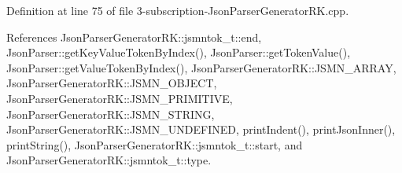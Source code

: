 Definition at line 75 of file 3-\/subscription-\/\+Json\+Parser\+Generator\+R\+K.\+cpp.



References Json\+Parser\+Generator\+R\+K\+::jsmntok\+\_\+t\+::end, Json\+Parser\+::get\+Key\+Value\+Token\+By\+Index(), Json\+Parser\+::get\+Token\+Value(), Json\+Parser\+::get\+Value\+Token\+By\+Index(), Json\+Parser\+Generator\+R\+K\+::\+J\+S\+M\+N\+\_\+\+A\+R\+R\+AY, Json\+Parser\+Generator\+R\+K\+::\+J\+S\+M\+N\+\_\+\+O\+B\+J\+E\+CT, Json\+Parser\+Generator\+R\+K\+::\+J\+S\+M\+N\+\_\+\+P\+R\+I\+M\+I\+T\+I\+VE, Json\+Parser\+Generator\+R\+K\+::\+J\+S\+M\+N\+\_\+\+S\+T\+R\+I\+NG, Json\+Parser\+Generator\+R\+K\+::\+J\+S\+M\+N\+\_\+\+U\+N\+D\+E\+F\+I\+N\+ED, print\+Indent(), print\+Json\+Inner(), print\+String(), Json\+Parser\+Generator\+R\+K\+::jsmntok\+\_\+t\+::start, and Json\+Parser\+Generator\+R\+K\+::jsmntok\+\_\+t\+::type.


